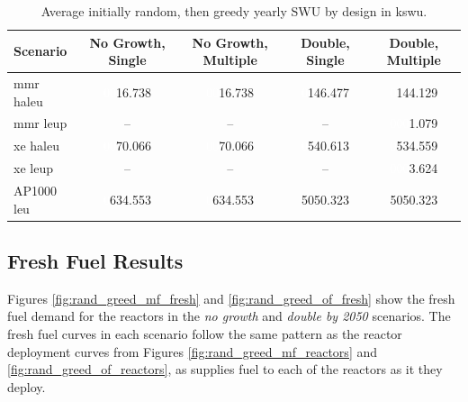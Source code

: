 \begin{table}[H]
    \centering
    \caption{Average initially random, then greedy yearly SWU by design in k\gls{swu}.}
    \label{tab:rand_greed_swu_avg}
    \begin{tabular}{l c c c c}
       \hline
       Scenario & No Growth, Single & No Growth, Multiple & Double, Single & Double, Multiple  \\
       \hline
       \gls{mmr} \gls{haleu}   & \textcolor{white}{00}16.738  & \textcolor{white}{00}16.738  & \textcolor{white}{0}146.477  & \textcolor{white}{0}144.129  \\
       \gls{mmr} \gls{leup}    & --      & --      & --       & \textcolor{white}{000}1.079    \\
       \gls{xe} \gls{haleu}    & \textcolor{white}{00}70.066  & \textcolor{white}{00}70.066  & \textcolor{white}{0}540.613  & \textcolor{white}{0}534.559  \\
       \gls{xe} \gls{leup}     & --      & --      & --       & \textcolor{white}{000}3.624    \\
       AP1000 \gls{leu}        & \textcolor{white}{0}634.553 & \textcolor{white}{0}634.553 & 5050.323 & 5050.323 \\
       \hline
    \end{tabular}
\end{table}



\subsection{Fresh Fuel Results}
\label{sec:rand_greed_fresh}

Figures \ref{fig:rand_greed_mf_fresh} and \ref{fig:rand_greed_of_fresh} show the fresh fuel demand for the reactors in the \textit{no growth} and \textit{double by 2050} scenarios. The fresh fuel curves in each scenario follow the same pattern as the reactor deployment curves from Figures \ref{fig:rand_greed_mf_reactors} and \ref{fig:rand_greed_of_reactors}, as \cyclus supplies fuel to each of the reactors as it they deploy.


